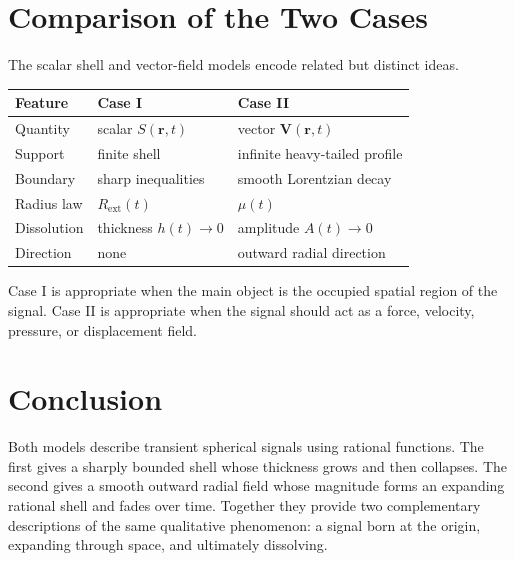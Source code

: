 \section{Comparison of the Two Cases}

The scalar shell and vector-field models encode related but distinct ideas.

\begin{center}
\begin{tabular}{lll}
\hline
Feature & Case I & Case II \\
\hline
Quantity & scalar \(S(\bm{r},t)\) & vector \(\bm{V}(\bm{r},t)\) \\
Support & finite shell & infinite heavy-tailed profile \\
Boundary & sharp inequalities & smooth Lorentzian decay \\
Radius law & \(R_{\mathrm{ext}}(t)\) & \(\mu(t)\) \\
Dissolution & thickness \(h(t)\to 0\) & amplitude \(A(t)\to 0\) \\
Direction & none & outward radial direction \\
\hline
\end{tabular}
\end{center}

Case I is appropriate when the main object is the occupied spatial region of
the signal. Case II is appropriate when the signal should act as a force,
velocity, pressure, or displacement field.

\section{Conclusion}

Both models describe transient spherical signals using rational functions. The
first gives a sharply bounded shell whose thickness grows and then collapses.
The second gives a smooth outward radial field whose magnitude forms an
expanding rational shell and fades over time. Together they provide two
complementary descriptions of the same qualitative phenomenon: a signal born at
the origin, expanding through space, and ultimately dissolving.

\endgroup
